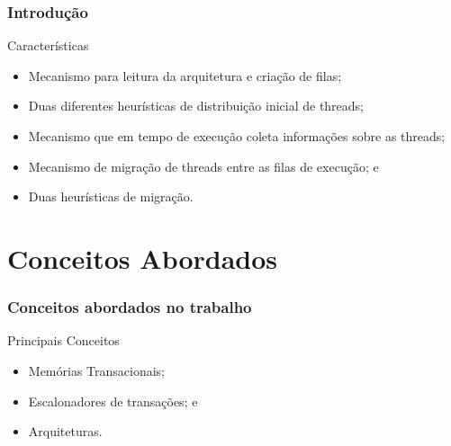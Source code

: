 \documentclass[10pt, pdf,xcolor=pdftex,dvipsnames,table]{beamer}
\begin{document}
\begin{frame} \frametitle{Introdução}
    \begin{block}{Características}
        \begin{itemize}
        	\item Mecanismo para leitura da arquitetura e criação de filas;
        	\item Duas diferentes heurísticas de distribuição inicial de threads;
        	\item Mecanismo que em tempo de execução coleta informações sobre as threads;
        	\item Mecanismo de migração de threads entre as filas de execução; e
        	\item Duas heurísticas de migração.            
        \end{itemize}
    \end{block}
\end{frame}

\section{Conceitos Abordados}
\begin{frame} \frametitle{Conceitos abordados no trabalho}
    \begin{block}{Principais Conceitos}
        \begin{itemize}
        	\item Memórias Transacionais;
        	\item Escalonadores de transações; e
        	\item Arquiteturas.
        \end{itemize}
    \end{block}
\end{frame}
\end{document}
